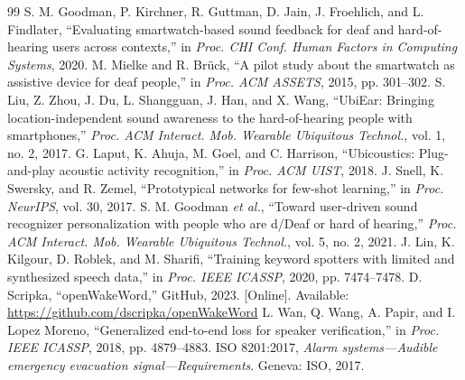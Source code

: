 \documentclass[12pt,a4paper,oneside]{report}
\begin{document}
\begin{thebibliography}{99}
 S. M. Goodman, P. Kirchner, R. Guttman, D. Jain, J. Froehlich, and L. Findlater, ``Evaluating smartwatch-based sound feedback for deaf and hard-of-hearing users across contexts,'' in \textit{Proc. CHI Conf. Human Factors in Computing Systems}, 2020.
 M. Mielke and R. Br\"uck, ``A pilot study about the smartwatch as assistive device for deaf people,'' in \textit{Proc. ACM ASSETS}, 2015, pp. 301--302.
 S. Liu, Z. Zhou, J. Du, L. Shangguan, J. Han, and X. Wang, ``UbiEar: Bringing location-independent sound awareness to the hard-of-hearing people with smartphones,'' \textit{Proc. ACM Interact. Mob. Wearable Ubiquitous Technol.}, vol. 1, no. 2, 2017.
 G. Laput, K. Ahuja, M. Goel, and C. Harrison, ``Ubicoustics: Plug-and-play acoustic activity recognition,'' in \textit{Proc. ACM UIST}, 2018.
 J. Snell, K. Swersky, and R. Zemel, ``Prototypical networks for few-shot learning,'' in \textit{Proc. NeurIPS}, vol. 30, 2017.
 S. M. Goodman \textit{et al.}, ``Toward user-driven sound recognizer personalization with people who are d/Deaf or hard of hearing,'' \textit{Proc. ACM Interact. Mob. Wearable Ubiquitous Technol.}, vol. 5, no. 2, 2021.
 J. Lin, K. Kilgour, D. Roblek, and M. Sharifi, ``Training keyword spotters with limited and synthesized speech data,'' in \textit{Proc. IEEE ICASSP}, 2020, pp. 7474--7478.
 D. Scripka, ``openWakeWord,'' GitHub, 2023. [Online]. Available: \url{https://github.com/dscripka/openWakeWord}
 L. Wan, Q. Wang, A. Papir, and I. Lopez Moreno, ``Generalized end-to-end loss for speaker verification,'' in \textit{Proc. IEEE ICASSP}, 2018, pp. 4879--4883.
 ISO 8201:2017, \textit{Alarm systems---Audible emergency evacuation signal---Requirements}. Geneva: ISO, 2017.
\end{thebibliography}

\clearpage
\renewcommand{\thefigure}{A.\arabic{figure}}\setcounter{figure}{0}
\end{document}
